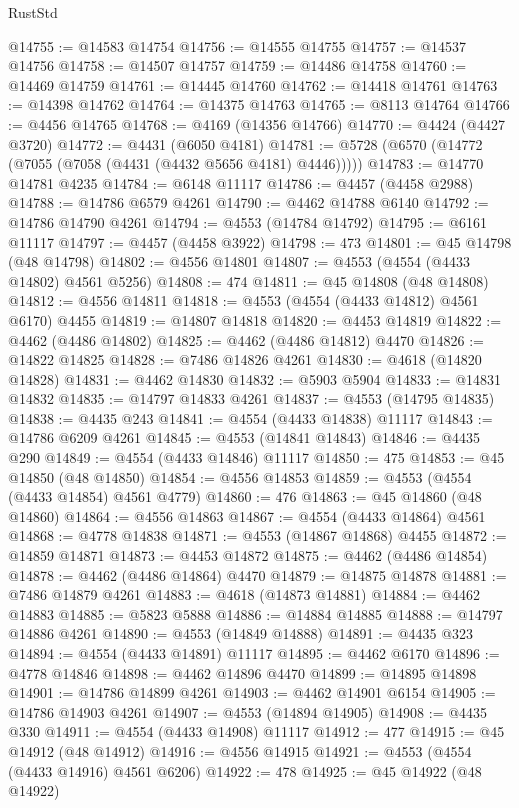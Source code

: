 \begin{lexlean}{RustStd}
\begin{coremodule}
@14755 := @14583 @14754
@14756 := @14555 @14755
@14757 := @14537 @14756
@14758 := @14507 @14757
@14759 := @14486 @14758
@14760 := @14469 @14759
@14761 := @14445 @14760
@14762 := @14418 @14761
@14763 := @14398 @14762
@14764 := @14375 @14763
@14765 := @8113 @14764
@14766 := @4456 @14765
@14768 := @4169 (@14356 @14766)
@14770 := @4424 (@4427 @3720)
@14772 := @4431 (@6050 @4181)
@14781 := @5728 (@6570 (@14772 (@7055 (@7058 (@4431 (@4432 @5656 @4181) @4446)))))
@14783 := @14770 @14781 @4235
@14784 := @6148 @11117
@14786 := @4457 (@4458 @2988)
@14788 := @14786 @6579 @4261
@14790 := @4462 @14788 @6140
@14792 := @14786 @14790 @4261
@14794 := @4553 (@14784 @14792)
@14795 := @6161 @11117
@14797 := @4457 (@4458 @3922)
@14798 := 473
@14801 := @45 @14798 (@48 @14798)
@14802 := @4556 @14801
@14807 := @4553 (@4554 (@4433 @14802) @4561 @5256)
@14808 := 474
@14811 := @45 @14808 (@48 @14808)
@14812 := @4556 @14811
@14818 := @4553 (@4554 (@4433 @14812) @4561 @6170) @4455
@14819 := @14807 @14818
@14820 := @4453 @14819
@14822 := @4462 (@4486 @14802)
@14825 := @4462 (@4486 @14812) @4470
@14826 := @14822 @14825
@14828 := @7486 @14826 @4261
@14830 := @4618 (@14820 @14828)
@14831 := @4462 @14830
@14832 := @5903 @5904
@14833 := @14831 @14832
@14835 := @14797 @14833 @4261
@14837 := @4553 (@14795 @14835)
@14838 := @4435 @243
@14841 := @4554 (@4433 @14838) @11117
@14843 := @14786 @6209 @4261
@14845 := @4553 (@14841 @14843)
@14846 := @4435 @290
@14849 := @4554 (@4433 @14846) @11117
@14850 := 475
@14853 := @45 @14850 (@48 @14850)
@14854 := @4556 @14853
@14859 := @4553 (@4554 (@4433 @14854) @4561 @4779)
@14860 := 476
@14863 := @45 @14860 (@48 @14860)
@14864 := @4556 @14863
@14867 := @4554 (@4433 @14864) @4561
@14868 := @4778 @14838
@14871 := @4553 (@14867 @14868) @4455
@14872 := @14859 @14871
@14873 := @4453 @14872
@14875 := @4462 (@4486 @14854)
@14878 := @4462 (@4486 @14864) @4470
@14879 := @14875 @14878
@14881 := @7486 @14879 @4261
@14883 := @4618 (@14873 @14881)
@14884 := @4462 @14883
@14885 := @5823 @5888
@14886 := @14884 @14885
@14888 := @14797 @14886 @4261
@14890 := @4553 (@14849 @14888)
@14891 := @4435 @323
@14894 := @4554 (@4433 @14891) @11117
@14895 := @4462 @6170
@14896 := @4778 @14846
@14898 := @4462 @14896 @4470
@14899 := @14895 @14898
@14901 := @14786 @14899 @4261
@14903 := @4462 @14901 @6154
@14905 := @14786 @14903 @4261
@14907 := @4553 (@14894 @14905)
@14908 := @4435 @330
@14911 := @4554 (@4433 @14908) @11117
@14912 := 477
@14915 := @45 @14912 (@48 @14912)
@14916 := @4556 @14915
@14921 := @4553 (@4554 (@4433 @14916) @4561 @6206)
@14922 := 478
@14925 := @45 @14922 (@48 @14922)

\end{coremodule}
\end{lexlean}
